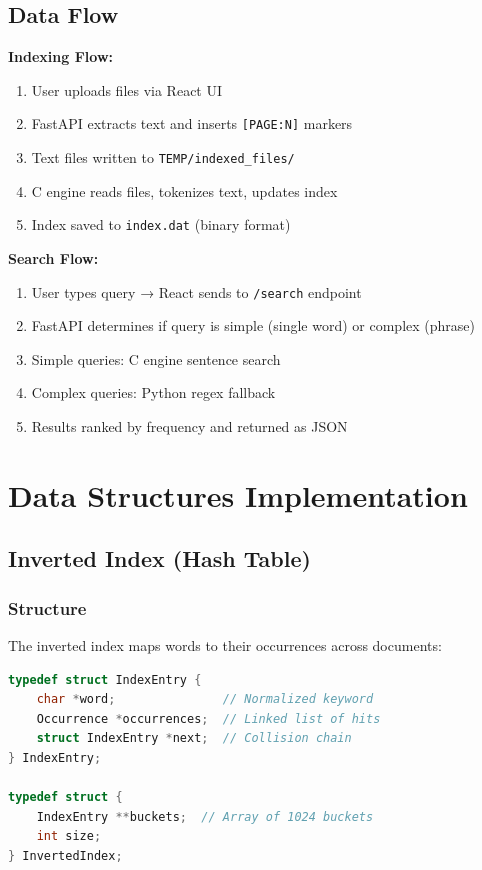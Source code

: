 \documentclass[12pt,a4paper]{article}
\begin{document}
\subsection{Data Flow}

\textbf{Indexing Flow:}
\begin{enumerate}
    \item User uploads files via React UI
    \item FastAPI extracts text and inserts \texttt{[PAGE:N]} markers
    \item Text files written to \texttt{TEMP/indexed\_files/}
    \item C engine reads files, tokenizes text, updates index
    \item Index saved to \texttt{index.dat} (binary format)
\end{enumerate}

\textbf{Search Flow:}
\begin{enumerate}
    \item User types query → React sends to \texttt{/search} endpoint
    \item FastAPI determines if query is simple (single word) or complex (phrase)
    \item Simple queries: C engine sentence search
    \item Complex queries: Python regex fallback
    \item Results ranked by frequency and returned as JSON
\end{enumerate}

\newpage
\section{Data Structures Implementation}

\subsection{Inverted Index (Hash Table)}

\subsubsection{Structure}
The inverted index maps words to their occurrences across documents:

\begin{lstlisting}[language=C]
typedef struct IndexEntry {
    char *word;               // Normalized keyword
    Occurrence *occurrences;  // Linked list of hits
    struct IndexEntry *next;  // Collision chain
} IndexEntry;

typedef struct {
    IndexEntry **buckets;  // Array of 1024 buckets
    int size;
} InvertedIndex;
\end{lstlisting}
\end{document}

